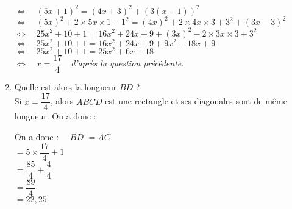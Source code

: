 \documentclass[a4paper,11pt,exos]{nsi}
\begin{document}
\begin{enumerate}
\begin{tabbing}
        \> $\iff\quad (5x+1)^2=(4x+3)^2+\left(3(x-1)\right)^2$\\
        \> $\iff\quad (5x)^2+2\times 5x\times 1+1^2=(4x)^2+2\times 4x\times 3+3^2+(3x-3)^2$\\
        \> $\iff\quad 25x^2+10+1=16x^2+24x+9+(3x)^2-2\times 3x\times 3+3^2$\\
        \> $\iff\quad 25x^2+10+1=16x^2+24x+9+9x^2-18x+9$\\
        \> $\iff\quad 25x^2+10+1=25x^2+6x+18$\\[0.5em]
        \> $\iff\quad x=\dfrac{17}{4}\quad$\textit{d'après la question précédente.}
    \end{tabbing}	
  
	\item	 \textcolor{UGLiBlue}{Quelle est alors la longueur $BD$ ?}\\[.5em]
	Si $x=\dfrac{17}{4}$, alors $ABCD$ est une rectangle et ses diagonales sont de même longueur. On a donc :
    \begin{tabbing}
        On a donc : $\quad BD$    \=$=AC$\\[.5em]
        \>  $=5\times \dfrac{17}{4}+1$\\[.5em]
        \>  $=\dfrac{85}{4}+\dfrac{4}{4}$\\[.5em]
        \>  $=\dfrac{89}{4}$\\[.5em]
        \>  $=22,25$
    \end{tabbing}
\end{enumerate}


\newpage

\setcounter{section}{0}
\end{document}
